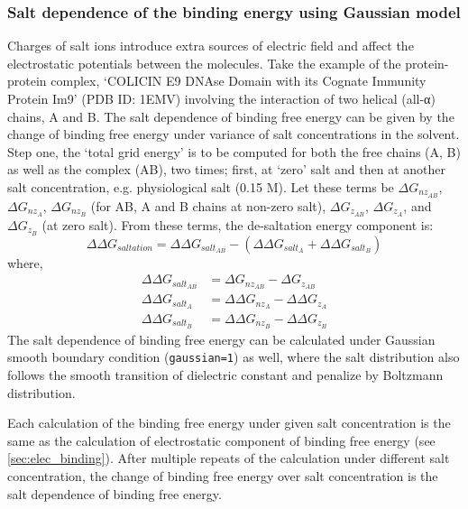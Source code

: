 \documentclass[9pt,tutorial]{livecoms}
\begin{document}
\subsubsection{Salt dependence of the binding energy using Gaussian model}
Charges of salt ions introduce extra sources of electric field and affect the electrostatic potentials between the molecules.  Take the example of the protein-protein complex, ‘COLICIN E9 DNAse Domain with its Cognate Immunity Protein Im9’ (PDB ID: 1EMV) involving the interaction of two helical (all-α) chains, A and B. The salt dependence of binding free energy can be given by the change of binding free energy under variance of salt concentrations in the solvent. Step one, the ‘total grid energy’ is to be computed for both the free chains (A, B) as well as the complex (AB), two times; first, at ‘zero’ salt and then at another salt concentration, e.g. physiological salt (0.15 M). Let these terms be $ \Delta G_{nz_{AB}}$, $ \Delta G_{nz_A}$, $ \Delta G_{nz_B}$ (for AB, A and B chains at non-zero salt), $ \Delta G_{z_{AB}}$, $ \Delta G_{z_A} $, and $ \Delta G_{z_B}$ (at zero salt). From these terms, the de-saltation energy component is:
\begin{equation}
 \Delta\Delta G_{saltation}= \Delta\Delta G_{salt_{AB}}  - \left( \Delta\Delta G_{salt_A}  + \Delta\Delta G_{salt_B} \right)
\end{equation}
where,
\begin{equation}
\begin{aligned}
\Delta\Delta G_{salt_{AB}}  &= \Delta G_{nz_{AB}}  - \Delta G_{z_{AB}}
\nonumber \\
\Delta\Delta G_{salt_A}  &= \Delta\Delta G_{nz_A}  - \Delta\Delta G_{z_A} \nonumber \\
\Delta\Delta G_{salt_B}  &= \Delta\Delta G_{nz_B}  - \Delta\Delta G_{z_B} \nonumber
\end{aligned}
\end{equation}
The salt dependence of binding free energy can be calculated under Gaussian smooth boundary condition (\texttt{gaussian=1}) as well, where the salt distribution also follows the smooth transition of dielectric constant and penalize by Boltzmann distribution\cite{jia2017treating}. 

Each calculation of the binding free energy under given salt concentration is the same as the calculation of electrostatic component of binding free energy (see \ref{sec:elec_binding}). After multiple repeats of the calculation under different salt concentration, the change of binding free energy over salt concentration is the salt dependence of binding free energy.
\end{document}

